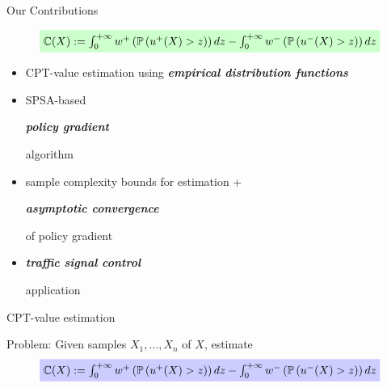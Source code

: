 \documentclass{beamer}
\begin{document}
\begin{frame}{Our Contributions}
\begin{small}
\begin{scriptsize}
\begin{align*}
\tikz[baseline]{
            \node[fill=green!20,anchor=base] (t1)
            {$\C(X):= \intinfinity w^+\left(\Prob{u^+(X)>z}\right) dz - \intinfinity w^-\left(\Prob{u^-(X)>z}\right) dz$};
        }
\end{align*}
  \begin{center}
\end{center}
\end{scriptsize}

\begin{itemize}
	\item CPT-value estimation using \alert{\footnotesize\bf\em empirical distribution functions}
	\item SPSA-based \begin{footnotesize}\alert{\bf\em policy gradient}\end{footnotesize}  algorithm
	\item sample complexity bounds for estimation + \begin{footnotesize}\alert{\bf\em asymptotic convergence}\end{footnotesize} of policy gradient
	\item \begin{footnotesize}\alert{\bf\em traffic signal control}\end{footnotesize} application
\end{itemize}
\end{small}

\end{frame}

\begin{frame}{CPT-value estimation}
\begin{small}

{\color{red} Problem:} Given samples $X_1, \ldots, X_n$ of $X$, estimate
%
\begin{align*}
\tikz[baseline]{
            \node[fill=blue!20,anchor=base] (t1)
            {$\C(X):= \intinfinity w^+\left(\Prob{u^+(X)>z}\right) dz - \intinfinity w^-\left(\Prob{u^-(X)>z}\right) dz$};
        }
\end{align*}

\vspace{0.25in}

				
\end{small}				
\end{frame}
\end{document}
